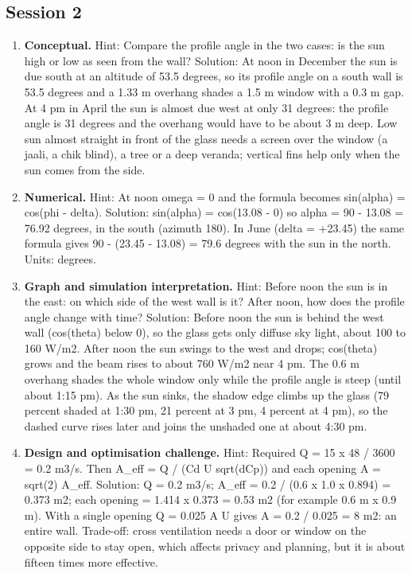 \documentclass[11pt,a4paper]{article}
\begin{document}
\subsection*{Session 2}
\begin{enumerate}[nosep]
\item \textbf{Conceptual.} Hint: Compare the profile angle in the two cases: is the sun high or low as seen from the wall? Solution: At noon in December the sun is due south at an altitude of 53.5 degrees, so its profile angle on a south wall is 53.5 degrees and a 1.33 m overhang shades a 1.5 m window with a 0.3 m gap. At 4 pm in April the sun is almost due west at only 31 degrees: the profile angle is 31 degrees and the overhang would have to be about 3 m deep. Low sun almost straight in front of the glass needs a screen over the window (a jaali, a chik blind), a tree or a deep veranda; vertical fins help only when the sun comes from the side.
\item \textbf{Numerical.} Hint: At noon omega = 0 and the formula becomes sin(alpha) = cos(phi - delta). Solution: sin(alpha) = cos(13.08 - 0) so alpha = 90 - 13.08 = 76.92 degrees, in the south (azimuth 180). In June (delta = +23.45) the same formula gives 90 - (23.45 - 13.08) = 79.6 degrees with the sun in the north. Units: degrees.
\item \textbf{Graph and simulation interpretation.} Hint: Before noon the sun is in the east: on which side of the west wall is it? After noon, how does the profile angle change with time? Solution: Before noon the sun is behind the west wall (cos(theta) below 0), so the glass gets only diffuse sky light, about 100 to 160 W/m2. After noon the sun swings to the west and drops; cos(theta) grows and the beam rises to about 760 W/m2 near 4 pm. The 0.6 m overhang shades the whole window only while the profile angle is steep (until about 1:15 pm). As the sun sinks, the shadow edge climbs up the glass (79 percent shaded at 1:30 pm, 21 percent at 3 pm, 4 percent at 4 pm), so the dashed curve rises later and joins the unshaded one at about 4:30 pm.
\item \textbf{Design and optimisation challenge.} Hint: Required Q = 15 x 48 / 3600 = 0.2 m3/s. Then A\_eff = Q / (Cd U sqrt(dCp)) and each opening A = sqrt(2) A\_eff. Solution: Q = 0.2 m3/s; A\_eff = 0.2 / (0.6 x 1.0 x 0.894) = 0.373 m2; each opening = 1.414 x 0.373 = 0.53 m2 (for example 0.6 m x 0.9 m). With a single opening Q = 0.025 A U gives A = 0.2 / 0.025 = 8 m2: an entire wall. Trade-off: cross ventilation needs a door or window on the opposite side to stay open, which affects privacy and planning, but it is about fifteen times more effective.
\end{enumerate}
\end{document}
